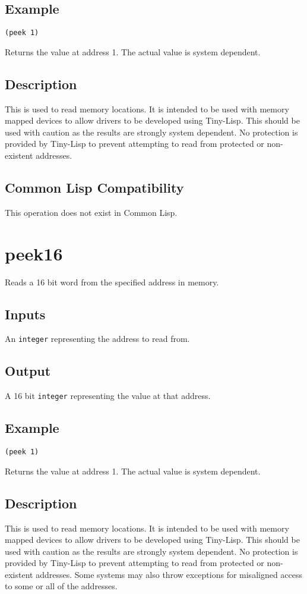 \documentclass[10pt, openany]{book}
\newcommand{\datatype}[1]{\texttt{#1}}
\newcommand{\tl}{Tiny-Lisp}
\newcommand{\cl}{Common Lisp}
\begin{document}
\subsection{Example}
\begin{lstlisting}
(peek 1)
\end{lstlisting}
Returns the value at address 1.  The actual value is system dependent.
\subsection{Description}
This is used to read memory locations.  It is intended to be used with memory mapped devices to allow drivers to be developed using \tl{}.  This should be used with caution as the results are strongly system dependent.  No protection is provided by \tl{} to prevent attempting to read from protected or non-existent addresses.
\subsection{Common Lisp Compatibility}
This operation does not exist in \cl.

\section{peek16}
Reads a 16 bit word from the specified address in memory.
\subsection{Inputs}
An \datatype{integer} representing the address to read from.
\subsection{Output}
A 16 bit \datatype{integer} representing the value at that address.
\subsection{Example}
\begin{lstlisting}
(peek 1)
\end{lstlisting}
Returns the value at address 1.  The actual value is system dependent.
\subsection{Description}
This is used to read memory locations.  It is intended to be used with memory mapped devices to allow drivers to be developed using \tl{}.  This should be used with caution as the results are strongly system dependent.  No protection is provided by \tl{} to prevent attempting to read from protected or non-existent addresses.  Some systems may also throw exceptions for misaligned access to some or all of the addresses.
\end{document}
